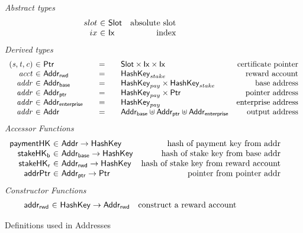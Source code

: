 \documentclass[11pt,a4paper,dvipsnames]{article}
\newcommand{\Ix}{\type{Ix}}
\newcommand{\Addr}{\type{Addr}}
\newcommand{\Slot}{\type{Slot}}
\newcommand{\AddrRWD}{\type{Addr_{rwd}}}
\newcommand{\AddrB}{\type{Addr_{base}}}
\newcommand{\AddrP}{\type{Addr_{ptr}}}
\newcommand{\AddrE}{\type{Addr_{enterprise}}}
\newcommand{\Ptr}{\type{Ptr}}
\newcommand{\HashKey}{\type{HashKey}}
\theoremstyle{definition}
\theoremstyle{definition}
\begin{document}
\begin{figure*}
  \emph{Abstract types}
  \begin{equation*}
    \begin{array}{r@{~\in~}lr}
      slot & \Slot & \text{absolute slot}\\
      ix & \Ix & \text{index}\\
    \end{array}
  \end{equation*}
  \emph{Derived types}
  \begin{equation*}
    \begin{array}{r@{~\in~}l@{\qquad=\qquad}lr}
      \var{(s,t,c)}
      & \Ptr
      & \Slot\times\Ix\times\Ix
      & \text{certificate pointer}
      \\
      \var{acct}
      & \AddrRWD
      & \HashKey_{stake}
      & \text{reward account}
      \\
      \var{addr}
      & \AddrB
      & \HashKey_{pay}\times\HashKey_{stake}
      & \text{base address}
      \\
      \var{addr}
      & \AddrP
      & \HashKey_{pay}\times\Ptr
      & \text{pointer address}
      \\
      \var{addr}
      & \AddrE
      & \HashKey_{pay}
      & \text{enterprise address}
      \\

      \var{addr}
      & \Addr
      & \AddrB \uniondistinct \AddrP \uniondistinct \AddrE
      & \text{output address}
      \\
    \end{array}
  \end{equation*}
  \emph{Accessor Functions}
  \begin{equation*}
    \begin{array}{r@{~\in~}lr}
      \fun{paymentHK} & \Addr \to \HashKey
                      & \text{hash of payment key from addr}\\
      \fun{stakeHK_b} & \AddrB \to \HashKey
                      & \text{hash of stake key from base addr}\\
      \fun{stakeHK_r} & \AddrRWD \to \HashKey
                      & \text{hash of stake key from reward account}\\
      \fun{addrPtr} & \AddrP \to \Ptr
                    & \text{pointer from pointer addr}\\
    \end{array}
  \end{equation*}
  \emph{Constructor Functions}
  \begin{equation*}
    \begin{array}{r@{~\in~}lr}
      \fun{addr_{rwd}}
        & \HashKey \to \AddrRWD
        & \text{construct a reward account}
    \end{array}
  \end{equation*}
  \caption{Definitions used in Addresses}
  \label{fig:defs:addresses}
\end{figure*}
\end{document}
